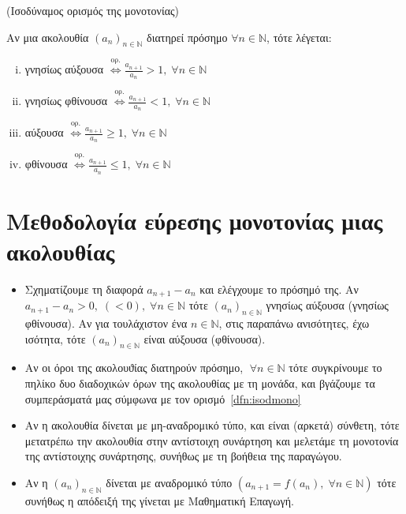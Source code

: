 \documentclass[main.tex]{subfiles}
\begin{document}
\begin{dfn}\label{dfn:isodmono}(Ισοδύναμος ορισμός της μονοτονίας)
\item {}
  Αν μια ακολουθία $ (a_{n})_{n \in \mathbb{N}} $ \textcolor{Col1}
  {διατηρεί πρόσημο}
  $ \forall n \in \mathbb{N} $, τότε λέγεται:
  \begin{enumerate}[i)]
    \item \textcolor{Col\thechapter}{γνησίως αύξουσα} 
      $ \overset{\text{ορ.}}{\Leftrightarrow} 
      \frac{a_{n+1}}{a_{n}} > 1, \; \forall n \in \mathbb{N}$
    \item \textcolor{Col\thechapter}{γνησίως φθίνουσα} 
      $ \overset{\text{ορ.}}{\Leftrightarrow} 
      \frac{a_{n+1}}{a_{n}} < 1, \; \forall n \in \mathbb{N}$
    \item  \textcolor{Col\thechapter}{αύξουσα} 
      $ \overset{\text{ορ.}}{\Leftrightarrow} 
      \frac{a_{n+1}}{a_{n}} \geq 1, \; \forall n \in \mathbb{N} $
    \item  \textcolor{Col\thechapter}{φθίνουσα}
      $ \overset{\text{ορ.}}{\Leftrightarrow} 
      \frac{a_{n+1}}{a_{n}} \leq 1, \; \forall n \in \mathbb{N} $
  \end{enumerate}
\end{dfn}

\section{Μεθοδολογία εύρεσης μονοτονίας μιας ακολουθίας}
\begin{itemize}
  \item Σχηματίζουμε τη διαφορά $ a_{n+1} - a_n $ και ελέγχουμε το 
    πρόσημό της. Αν $ a_{n+1}-a_{n}>0, \; (<0), \; \forall n \in 
    \mathbb{N} $ τότε $ (a_{n})_{n \in \mathbb{N}}$ γνησίως 
    αύξουσα (γνησίως φθίνουσα). Αν για τουλάχιστον ένα 
    $ n \in \mathbb{N} $, στις παραπάνω ανισότητες, έχω ισότητα, 
    τότε  $ (a_{n})_{n \in \mathbb{N}} $ είναι αύξουσα (φθίνουσα).
  \item Αν οι όροι της ακολουϑίας διατηρούν πρόσημο, $ \; \forall n \in
    \mathbb{N} $ τότε συγκρίνουμε το πηλίκο δυο διαδοχικών όρων της 
    ακολουθίας με τη μονάδα, και βγάζουμε τα συμπεράσματά μας 
    σύμφωνα με τον ορισμό~\ref{dfn:isodmono}
  \item Αν η ακολουθία δίνεται με μη-αναδρομικό τύπο, και είναι 
    (αρκετά) σύνθετη, τότε μετατρέπω την ακολουθία στην αντίστοιχη 
    συνάρτηση και μελετάμε τη μονοτονία της αντίστοιχης συνάρτησης, 
    συνήθως με τη βοήθεια της παραγώγου.
  \item Αν η $ (a_{n})_{n \in \mathbb{N}} $ δίνεται με αναδρομικό 
    τύπο $ (a_{n+1}= f(a_{n}), \; \forall n \in \mathbb{N}) $ τότε 
    συνήθως η απόδειξή της γίνεται με Μαθηματική Επαγωγή.
\end{itemize}
\end{document}
